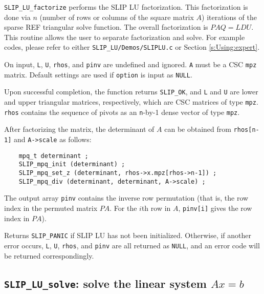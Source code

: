 \documentclass[12pt]{article}
\theoremstyle{definition}
\begin{document}
\verb|SLIP_LU_factorize| performs the SLIP LU factorization. This factorization
is done via $n$ (number of rows or columns of the square matrix $A$) iterations
of the sparse REF triangular solve function. The overall factorization is
$PAQ = LDU$.  This routine allows the user to separate factorization and solve.
For example codes, please refer to either \verb|SLIP_LU/Demos/SLIPLU.c| or
Section \ref{s:Using:expert}.

On input, \verb|L|, \verb|U|, \verb|rhos|, and \verb|pinv| are undefined and
ignored.  \verb|A| must be a CSC \verb|mpz| matrix. Default settings are used
if \verb|option| is input as \verb|NULL|.

Upon successful completion, the function returns \verb|SLIP_OK|, and \verb|L|
and \verb|U| are lower and upper triangular matrices, respectively, which are
CSC matrices of type \verb|mpz|.  \verb|rhos| contains the sequence of pivots
as an \verb|n|-by-1 dense vector of type \verb|mpz|.

After factorizing the matrix, the determinant of $A$ can be obtained from
\verb|rhos[n-1]| and \verb|A->scale| as follows:

\begin{verbatim}
    mpq_t determinant ;
    SLIP_mpq_init (determinant) ;
    SLIP_mpq_set_z (determinant, rhos->x.mpz[rhos->n-1]) ;
    SLIP_mpq_div (determinant, determinant, A->scale) ;
\end{verbatim}

The output array \verb|pinv| contains the inverse row permutation (that is, the
row index in the permuted matrix $PA$. For the $i$th row in $A$, \verb|pinv[i]|
gives the row index in $PA$). 

Returns \verb|SLIP_PANIC| if SLIP LU has not been initialized.  Otherwise, if
another error occurs, \verb|L|, \verb|U|, \verb|rhos|, and \verb|pinv| are all
returned as \verb|NULL|, and an error code will be returned correspondingly.

\newpage
\cprotect\subsection{\verb|SLIP_LU_solve|: solve the linear system $Ax=b$}
\label{ss:SLIP_LU_solve}
\end{document}

